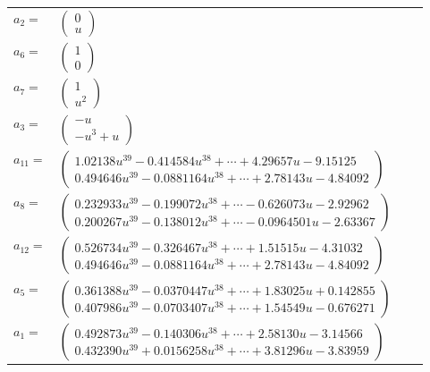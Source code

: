 \documentclass[1p]{elsarticle_modified}
\theoremstyle{definition}
\begin{document}
\begin{tabular}{m{7pt} m{180pt} m{7pt} m{180pt} }
\flushright $a_{2}=$&$\begin{pmatrix}0\\u\end{pmatrix}$ \\
\flushright $a_{6}=$&$\begin{pmatrix}1\\0\end{pmatrix}$ \\
\flushright $a_{7}=$&$\begin{pmatrix}1\\u^2\end{pmatrix}$ \\
\flushright $a_{3}=$&$\begin{pmatrix}- u\\- u^3+u\end{pmatrix}$ \\
\flushright $a_{11}=$&$\begin{pmatrix}1.02138 u^{39}-0.414584 u^{38}+\cdots+4.29657 u-9.15125\\0.494646 u^{39}-0.0881164 u^{38}+\cdots+2.78143 u-4.84092\end{pmatrix}$ \\
\flushright $a_{8}=$&$\begin{pmatrix}0.232933 u^{39}-0.199072 u^{38}+\cdots-0.626073 u-2.92962\\0.200267 u^{39}-0.138012 u^{38}+\cdots-0.0964501 u-2.63367\end{pmatrix}$ \\
\flushright $a_{12}=$&$\begin{pmatrix}0.526734 u^{39}-0.326467 u^{38}+\cdots+1.51515 u-4.31032\\0.494646 u^{39}-0.0881164 u^{38}+\cdots+2.78143 u-4.84092\end{pmatrix}$ \\
\flushright $a_{5}=$&$\begin{pmatrix}0.361388 u^{39}-0.0370447 u^{38}+\cdots+1.83025 u+0.142855\\0.407986 u^{39}-0.0703407 u^{38}+\cdots+1.54549 u-0.676271\end{pmatrix}$ \\
\flushright $a_{1}=$&$\begin{pmatrix}0.492873 u^{39}-0.140306 u^{38}+\cdots+2.58130 u-3.14566\\0.432390 u^{39}+0.0156258 u^{38}+\cdots+3.81296 u-3.83959\end{pmatrix}$ \\

\end{tabular}
\end{document}
